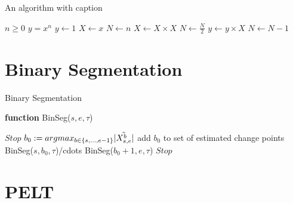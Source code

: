 \documentclass{article}
\begin{document}
\begin{algorithm}
\caption{An algorithm with caption}\label{alg:cap}
\begin{algorithmic}
\Require $n \geq 0$
\Ensure $y = x^n$
\State $y \gets 1$
\State $X \gets x$
\State $N \gets n$
    \State $X \gets X \times X$
    \State $N \gets \frac{N}{2}$  
    \State $y \gets y \times X$
    \State $N \gets N - 1$
\EndIf
\EndWhile
\end{algorithmic}
\end{algorithm}

\section{Binary Segmentation}
\begin{algorithm}
\caption{Binary Segmentation}\label{alg:cap}
\textbf{function} BinSeg($s,e,\tau$)
\begin{algorithmic}
        \State $Stop$
    \Else
        \State$b_{0} := argmax_{b\in \{s,...,e-1\}} |\Tilde{X_{s,e}^{b}}|$
            \State add $b_0$ to set of estimated change points
            \State BinSeg($s,b_{0},\tau$)/cdots
            \State BinSeg($b_{0}+1,e,\tau$)
        \Else
            \State $Stop$
            \EndIf
        \EndIf
\end{algorithmic}
\end{algorithm}

\section{PELT}
\end{document}
